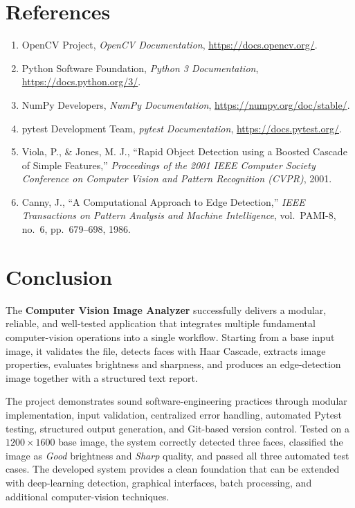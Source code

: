\documentclass[11pt,a4paper]{article}
\begin{document}
\section{References}
\begin{enumerate}[leftmargin=1.5em, nosep]
    \item OpenCV Project, \textit{OpenCV Documentation}, \url{https://docs.opencv.org/}.
    \item Python Software Foundation, \textit{Python 3 Documentation}, \url{https://docs.python.org/3/}.
    \item NumPy Developers, \textit{NumPy Documentation}, \url{https://numpy.org/doc/stable/}.
    \item pytest Development Team, \textit{pytest Documentation}, \url{https://docs.pytest.org/}.
    \item Viola, P., \& Jones, M. J., ``Rapid Object Detection using a Boosted Cascade of Simple Features,'' \emph{Proceedings of the 2001 IEEE Computer Society Conference on Computer Vision and Pattern Recognition (CVPR)}, 2001.
    \item Canny, J., ``A Computational Approach to Edge Detection,'' \emph{IEEE Transactions on Pattern Analysis and Machine Intelligence}, vol.\ PAMI-8, no.\ 6, pp.\ 679--698, 1986.
\end{enumerate}

\section{Conclusion}
The \textbf{Computer Vision Image Analyzer} successfully delivers a modular, reliable, and well-tested application that integrates multiple fundamental computer-vision operations into a single workflow. Starting from a base input image, it validates the file, detects faces with Haar Cascade, extracts image properties, evaluates brightness and sharpness, and produces an edge-detection image together with a structured text report.

The project demonstrates sound software-engineering practices through modular implementation, input validation, centralized error handling, automated Pytest testing, structured output generation, and Git-based version control. Tested on a $1200 \times 1600$ base image, the system correctly detected three faces, classified the image as \emph{Good} brightness and \emph{Sharp} quality, and passed all three automated test cases. The developed system provides a clean foundation that can be extended with deep-learning detection, graphical interfaces, batch processing, and additional computer-vision techniques.
\end{document}

